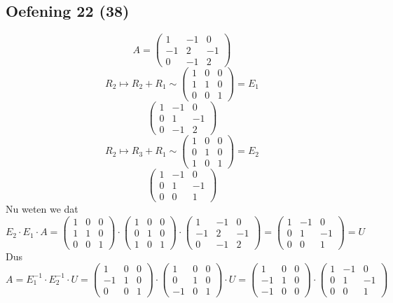 \documentclass[lineaire_algebra_oplossingen.tex]{subfiles}
\begin{document}
\subsection{Oefening 22 (38)}
\[
A=
\begin{pmatrix}
1 & -1 & 0 \\
-1 & 2 & -1 \\
0 & -1 & 2 
\end{pmatrix}
\]
\[
R_2 \longmapsto R_2+R_1 \sim
\begin{pmatrix}
1 & 0 & 0\\
1 & 1 & 0\\
0 & 0 & 1 
\end{pmatrix}
=E_1
\]
\[
\begin{pmatrix}
1 & -1 & 0 \\
0 & 1 & -1 \\
0 & -1 & 2  
\end{pmatrix}
\]
\[
R_2 \longmapsto R_3+R_1 \sim
\begin{pmatrix}
1 & 0 & 0\\
0 & 1 & 0\\
1 & 0 & 1 
\end{pmatrix}
=E_2
\]
\[
\begin{pmatrix}
1 & -1 & 0 \\
0 & 1 & -1 \\
0 & 0 & 1 
\end{pmatrix}
\]
Nu weten we dat
\[
E_2 \cdot E_1 \cdot A 
=
\begin{pmatrix}
1 & 0 & 0\\
1 & 1 & 0\\
0 & 0 & 1 
\end{pmatrix}
\cdot
\begin{pmatrix}
1 & 0 & 0\\
0 & 1 & 0\\
1 & 0 & 1 
\end{pmatrix}
\cdot
\begin{pmatrix}
1 & -1 & 0 \\
-1 & 2 & -1 \\
0 & -1 & 2 
\end{pmatrix}
=
\begin{pmatrix}
1 & -1 & 0 \\
0 & 1 & -1 \\
0 & 0 & 1 
\end{pmatrix}
= U
\]
Dus
\[
A = E_1^{-1} \cdot E_2^{-1} \cdot U
=
\begin{pmatrix}
1 & 0 & 0\\
-1 & 1 & 0\\
0 & 0 & 1 
\end{pmatrix}
\cdot
\begin{pmatrix}
1 & 0 & 0\\
0 & 1 & 0\\
-1 & 0 & 1 
\end{pmatrix}
\cdot
U
=
\begin{pmatrix}
1 & 0 & 0\\
-1 & 1 & 0\\
-1 & 0 & 0
\end{pmatrix}
\cdot
\begin{pmatrix}
1 & -1 & 0 \\
0 & 1 & -1 \\
0 & 0 & 1 
\end{pmatrix}
\]
\end{document}
